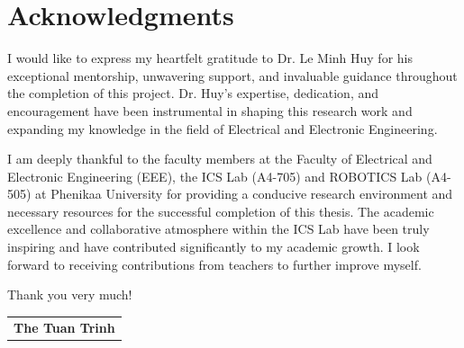 \section*{Acknowledgments}

I would like to express my heartfelt gratitude to Dr. Le Minh Huy for his exceptional mentorship, unwavering support, and invaluable guidance throughout the completion of this project. Dr. Huy's expertise, dedication, and encouragement have been instrumental in shaping this research work and expanding my knowledge in the field of Electrical and Electronic Engineering.

I am deeply thankful to the faculty members at the Faculty of Electrical and Electronic Engineering (EEE), the ICS Lab (A4-705) and ROBOTICS Lab (A4-505) at Phenikaa University for providing a conducive research environment and necessary resources for the successful completion of this thesis. The academic excellence and collaborative atmosphere within the ICS Lab have been truly inspiring and have contributed significantly to my academic growth.
I look forward to receiving contributions from teachers to further improve myself.

Thank you very much!


\begin{flushright}
	\begin{tabular}{c}
		\textbf{The Tuan Trinh}\\
	\end{tabular}
\end{flushright}
